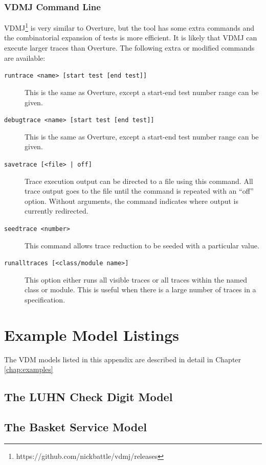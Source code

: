 \documentclass{overturerepchap}
\begin{document}
\subsection{VDMJ Command Line}

VDMJ\footnote{https://github.com/nickbattle/vdmj/releases} is very similar to
Overture, but the tool has some extra commands and the combinatorial expansion
of tests is more efficient. It is likely that VDMJ can execute larger traces
than Overture. The following extra or modified commands are available:

\begin{description}
\item[\texttt{runtrace <name> [start test [end test]]}] This is the same as
Overture, except a start-end test number range can be given.
\item[\texttt{debugtrace <name> [start test [end test]]}] This is the same as
Overture, except a start-end test number range can be given.
\item[\texttt{savetrace [<file> | off]}] Trace execution output can be directed
to a file using this command. All trace output goes to the file until the
command is repeated with an ``off'' option. Without arguments, the command
indicates where output is currently redirected.
\item[\texttt{seedtrace <number>}] This command allows trace reduction to be
seeded with a particular value.
\item[\texttt{runalltraces [<class/module name>]}] This option either runs all
visible traces or all traces within the named class or module. This is useful
when there is a large number of traces in a specification.
\end{description}



\chapter{Example Model Listings}
\label{chap:listings}
The VDM models listed in this appendix are described in detail in Chapter
\ref{chap:examples}

\section{The LUHN Check Digit Model}

\scriptsize




\normalsize

\section{The Basket Service Model}

\scriptsize


\normalsize




\end{document}
